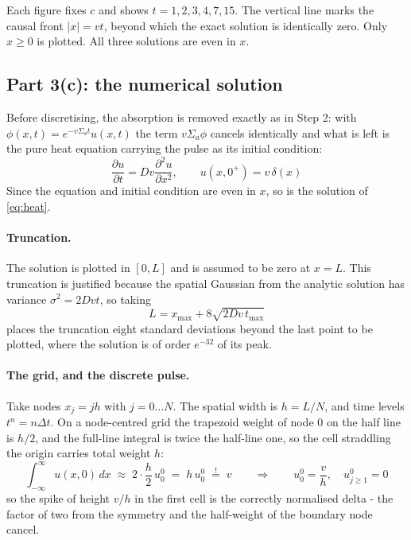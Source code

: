 \documentclass[11pt]{article}
\begin{document}
Each figure fixes $c$ and shows $t = 1, 2, 3, 4, 7, 15$. The vertical line marks the causal
front $|x| = vt$, beyond which the exact solution is identically zero. Only $x \ge 0$ is
plotted. All three solutions are even in $x$.

\subsection*{Part 3(c): the numerical solution}
\label{sec:numerical}

Before discretising, the absorption is removed exactly as in Step 2: with
$\phi(x,t) = e^{-v\Sigma_a t}u(x,t)$ the term $v\Sigma_a\phi$ cancels identically and what is
left is the pure heat equation carrying the pulse as its initial condition:
\begin{equation}
    \frac{\partial u}{\partial t} = Dv\frac{\partial^2 u}{\partial x^2},
    \qquad u(x,0^+) = v\,\delta(x)
    \label{eq:heat}
\end{equation}
Since the equation and initial condition are even in $x$, so is the solution of \eqref{eq:heat}.
\paragraph{Truncation.} The solution is plotted in $[0,L]$ and is assumed to be zero at $x=L$. This truncation is justified because the spatial Gaussian from the analytic solution has variance $\sigma^2 = 2Dvt$, so taking
\begin{equation}
    L = x_{\max} + 8\sqrt{2Dv\,t_{\max}}
\end{equation}
places the truncation eight standard deviations beyond the last point to be plotted, where the
solution is of order $e^{-32}$ of its peak.

\paragraph{The grid, and the discrete pulse.} Take nodes $x_j = jh$ with $j = 0\ldots N$.
The spatial width is $h = L/N$, and time levels $t^n = n\Delta t$. On a node-centred grid the trapezoid weight of node
$0$ on the half line is $h/2$, and the full-line integral is twice the half-line one, so the
cell straddling the origin carries total weight $h$:
\begin{equation}
    \int_{-\infty}^{\infty} u(x,0)\,dx \;\approx\; 2\cdot\frac{h}{2}\,u_0^0 \;=\; h\,u_0^0
    \;\overset{!}{=}\; v
    \qquad\Longrightarrow\qquad
    u_0^0 = \frac{v}{h}, \quad u_{j\ge1}^0 = 0
    \label{eq:ic}
\end{equation}
so the spike of height $v/h$ in the first cell is the correctly normalised delta - the
factor of two from the symmetry and the half-weight of the boundary node cancel.
\end{document}

